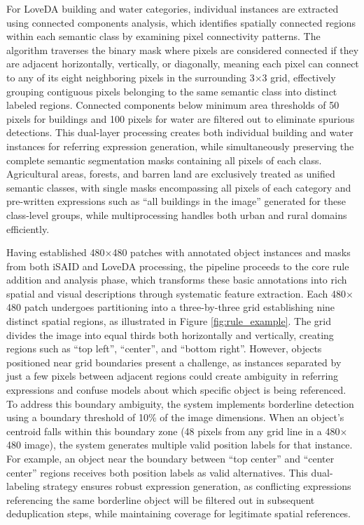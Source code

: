 For LoveDA building and water categories, individual instances are extracted using connected components analysis, which identifies spatially connected regions within each semantic class by examining pixel connectivity patterns. The algorithm traverses the binary mask where pixels are considered connected if they are adjacent horizontally, vertically, or diagonally, meaning each pixel can connect to any of its eight neighboring pixels in the surrounding 3$\times$3 grid, effectively grouping contiguous pixels belonging to the same semantic class into distinct labeled regions. Connected components below minimum area thresholds of 50 pixels for buildings and 100 pixels for water are filtered out to eliminate spurious detections. This dual-layer processing creates both individual building and water instances for referring expression generation, while simultaneously preserving the complete semantic segmentation masks containing all pixels of each class. Agricultural areas, forests, and barren land are exclusively treated as unified semantic classes, with single masks encompassing all pixels of each category and pre-written expressions such as ``all buildings in the image'' generated for these class-level groups, while multiprocessing handles both urban and rural domains efficiently.

Having established 480$\times$480 patches with annotated object instances and masks from both iSAID and LoveDA processing, the pipeline proceeds to the core rule addition and analysis phase, which transforms these basic annotations into rich spatial and visual descriptions through systematic feature extraction. Each 480$\times$480 patch undergoes partitioning into a three-by-three grid establishing nine distinct spatial regions, as illustrated in Figure \ref{fig:rule_example}. The grid divides the image into equal thirds both horizontally and vertically, creating regions such as ``top left'', ``center'', and ``bottom right''. However, objects positioned near grid boundaries present a challenge, as instances separated by just a few pixels between adjacent regions could create ambiguity in referring expressions and confuse models about which specific object is being referenced. To address this boundary ambiguity, the system implements borderline detection using a boundary threshold of 10\% of the image dimensions. When an object's centroid falls within this boundary zone (48 pixels from any grid line in a 480$\times$480 image), the system generates multiple valid position labels for that instance. For example, an object near the boundary between ``top center'' and ``center center'' regions receives both position labels as valid alternatives. This dual-labeling strategy ensures robust expression generation, as conflicting expressions referencing the same borderline object will be filtered out in subsequent deduplication steps, while maintaining coverage for legitimate spatial references.

